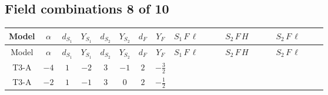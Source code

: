 \documentclass[8pt]{article}
\begin{document}
\begin{landscape}
\subsection*{Field combinations 8 of 10}
\begin{longtable}{@{}cccccccc >{\raggedright\arraybackslash}p{0.21\linewidth} >{\raggedright\arraybackslash}p{0.21\linewidth} >{\raggedright\arraybackslash}p{0.21\linewidth}@{}}
\toprule
Model & $\alpha$ & $d_{S_1}$ & $Y_{S_1}$ & $d_{S_2}$ & $Y_{S_2}$ & $d_F$ & $Y_F$ & $S_1\,F\,\ell$ & $S_2\,F\,H$ & $S_2\,F\,\ell$ \\
\midrule
\endfirsthead
\toprule
Model & $\alpha$ & $d_{S_1}$ & $Y_{S_1}$ & $d_{S_2}$ & $Y_{S_2}$ & $d_F$ & $Y_F$ & $S_1\,F\,\ell$ & $S_2\,F\,H$ & $S_2\,F\,\ell$ \\
\midrule
\endhead
T3-A & $-4$ & $1$ & $-2$ & $3$ & $-1$ & $2$ & $-\frac{3}{2}$ &  & \scriptsize\adjustbox{max width=\linewidth}{$\begin{gathered} -\frac{2 \hbar  \log \left(\frac{\bar{\mu}^{2}}{M_F^2}\right) \overline{y_{2,i_1,r_1}} \overline{Y_{e,i_2,i_3}} H_{a_1} S_{2,j_1} y_{2,i_2,r_1} Y_{e,i_1,i_3} H_{a_1}{}^{\dagger } S_{2,j_1}{}^{\dagger }}{\sqrt{3}} \\ -2 i \sqrt{\frac{2}{3}} \hbar  \log \left(\frac{\bar{\mu}^{2}}{M_F^2}\right) \overline{y_{2,i_1,r_1}} \overline{Y_{e,i_2,i_3}} H_{a_2} S_{2,j_2} y_{2,i_2,r_1} Y_{e,i_1,i_3} H_{a_1}{}^{\dagger } S_{2,j_1}{}^{\dagger } \mathcal{I}_{H2,a_1,a_2,j_1,j_2}{}^1 \\ -\frac{2 \hbar  \log \left(\frac{\bar{\mu}^{2}}{M_F^2}\right) \overline{y_{2,i_1,r_1}} H_{a_2} S_{2,j_2} y_{2,i_1,r_1} H_{a_1}{}^{\dagger } S_{2,j_1}{}^{\dagger } \mathcal{I}_{H2,a_1,a_2,j_1,j_2}{}^2 \lambda_{HS_2}^{(2)}}{\sqrt{3}}\end{gathered}$} &  \\
\midrule
T3-A & $-2$ & $1$ & $-1$ & $3$ & $0$ & $2$ & $-\frac{1}{2}$ &  & \scriptsize\adjustbox{max width=\linewidth}{$\begin{gathered} -\frac{2 \hbar  \log \left(\frac{\bar{\mu}^{2}}{M_F^2}\right) \overline{y_{2,i_1,r_1}} \overline{Y_{e,i_2,i_3}} H_{a_1} S_{2,j_1} y_{2,i_2,r_1} Y_{e,i_1,i_3} H_{a_1}{}^{\dagger } S_{2,j_1}{}^{\dagger }}{\sqrt{3}} \\ -2 i \sqrt{\frac{2}{3}} \hbar  \log \left(\frac{\bar{\mu}^{2}}{M_F^2}\right) \overline{y_{2,i_1,r_1}} \overline{Y_{e,i_2,i_3}} H_{a_2} S_{2,j_2} y_{2,i_2,r_1} Y_{e,i_1,i_3} H_{a_1}{}^{\dagger } S_{2,j_1}{}^{\dagger } \mathcal{I}_{H2,a_1,a_2,j_1,j_2}{}^1 \\ -\frac{2 \hbar  \log \left(\frac{\bar{\mu}^{2}}{M_F^2}\right) \overline{y_{2,i_1,r_1}} H_{a_2} S_{2,j_2} y_{2,i_1,r_1} H_{a_1}{}^{\dagger } S_{2,j_1}{}^{\dagger } \mathcal{I}_{H2,a_1,a_2,j_1,j_2}{}^2 \lambda_{HS_2}^{(2)}}{\sqrt{3}}\end{gathered}$} &  \\

\end{longtable}
\end{landscape}
\end{document}
